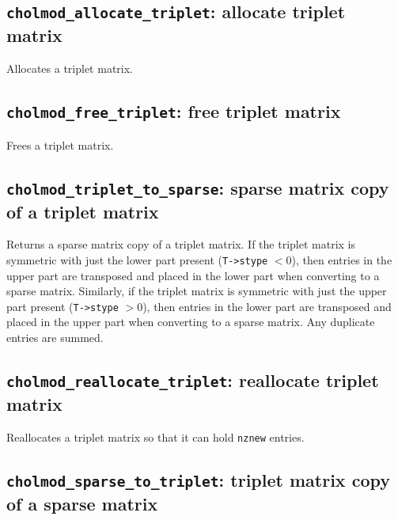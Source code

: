 \documentclass[11pt]{article}
\begin{document}
\subsection{{\tt cholmod\_allocate\_triplet}: allocate triplet matrix}


Allocates a triplet matrix.

\subsection{{\tt cholmod\_free\_triplet}: free triplet matrix}


Frees a triplet matrix.

\subsection{{\tt cholmod\_triplet\_to\_sparse}: sparse matrix copy of a triplet
matrix}


Returns a sparse matrix copy of a triplet matrix.  If the triplet matrix is
symmetric with just the lower part present ({\tt T->stype} $< 0$), then entries
in the upper part are transposed and placed in the lower part when converting
to a sparse matrix.  Similarly, if the triplet matrix is symmetric with just
the upper part present ({\tt T->stype} $> 0$), then entries in the lower part
are transposed and placed in the upper part when converting to a sparse matrix.
Any duplicate entries are summed.

\subsection{{\tt cholmod\_reallocate\_triplet}: reallocate triplet matrix}


Reallocates a triplet matrix so that it can hold {\tt nznew} entries.

\subsection{{\tt cholmod\_sparse\_to\_triplet}: triplet matrix copy of a sparse matrix}
\end{document}
